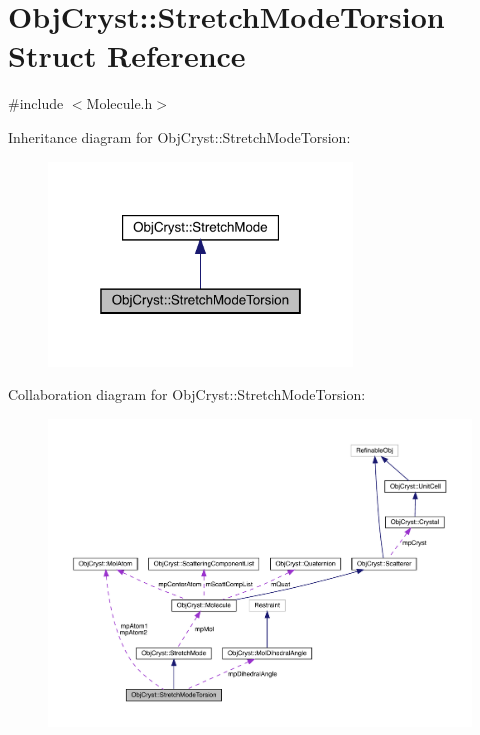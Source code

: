 \hypertarget{struct_obj_cryst_1_1_stretch_mode_torsion}{}\section{Obj\+Cryst\+::Stretch\+Mode\+Torsion Struct Reference}
\label{struct_obj_cryst_1_1_stretch_mode_torsion}


{\ttfamily \#include $<$Molecule.\+h$>$}



Inheritance diagram for Obj\+Cryst\+::Stretch\+Mode\+Torsion\+:
\nopagebreak
\begin{figure}[H]
\begin{center}
\leavevmode
\includegraphics[width=229pt]{struct_obj_cryst_1_1_stretch_mode_torsion__inherit__graph}
\end{center}
\end{figure}


Collaboration diagram for Obj\+Cryst\+::Stretch\+Mode\+Torsion\+:
\nopagebreak
\begin{figure}[H]
\begin{center}
\leavevmode
\includegraphics[width=350pt]{struct_obj_cryst_1_1_stretch_mode_torsion__coll__graph}
\end{center}
\end{figure}
